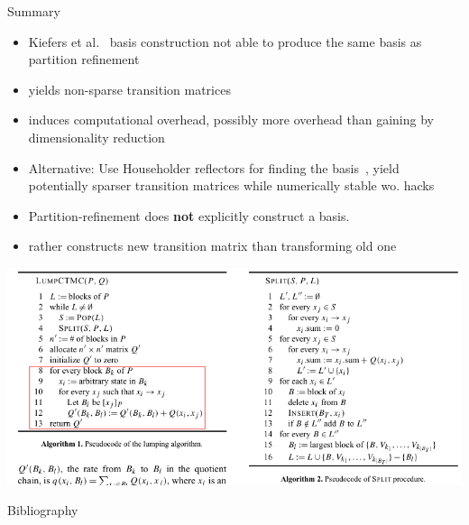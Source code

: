 \documentclass[rgb, pdf]{beamer}
\begin{document}
        \begin{frame}[allowframebreaks]{Summary}
        \begin{itemize}
         \item Kiefers et al.~\autocite{Kiefer2013OnTC} basis construction not able to produce the same basis as partition refinement
         \item yields non-sparse transition matrices 
         \item induces computational overhead, possibly more overhead than gaining by dimensionality reduction
         \item Alternative: Use Householder reflectors for finding the basis~\autocite{kieferstab}, yield potentially sparser transition matrices while numerically stable wo. hacks
         \item Partition-refinement does \textbf{not} explicitly construct a basis.
         \item rather constructs new  transition matrix than transforming old one
        \end{itemize}
        \framebreak
         \includegraphics[height=0.8\textheight, width=\textwidth, keepaspectratio]{img/derisavi_pseudocode.png}
    \end{frame}

    \begin{frame}{Bibliography}
        \printbibliography
    \end{frame}
\end{document}

